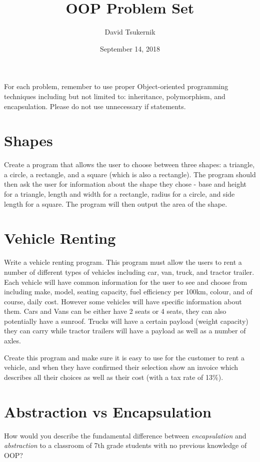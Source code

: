 \documentclass{problem-set}
\title{OOP Problem Set}
\date{September 14, 2018}
\author{David Tsukernik}
\begin{document}
\maketitle

\vspace{3ex}
For each problem, remember to use proper Object-oriented programming techniques including but not limited to: inheritance, polymorphism, and encapsulation. Please do not use unnecessary if statements.

\section{Shapes}

Create a program that allows the user to choose between three shapes: a triangle, a circle, a rectangle, and a square (which is also a rectangle). The program should then ask the user for information about the shape they chose - base and height for a triangle, length and width for a rectangle, radius for a circle, and side length for a square. The program will then output the area of the shape.

\section{Vehicle Renting}

Write a vehicle renting program. This program must allow the users to rent a number of different types of vehicles including car, van, truck, and tractor trailer. Each vehicle will have common information for the user to see and choose from including make, model, seating capacity, fuel efficiency per 100km, colour, and of course, daily cost. However some vehicles will have specific information about them. Cars and Vans can be either have 2 seats or 4 seats, they can also potentially have a sunroof. Trucks will have a certain payload (weight capacity) they can carry while tractor trailers will have a payload as well as a number of axles.

Create this program and make sure it is easy to use for the customer to rent a vehicle, and when they have confirmed their selection show an invoice which describes all their choices as well as their cost (with a tax rate of 13\%).

\section{Abstraction vs Encapsulation}

How would you describe the fundamental difference between \textit{encapsulation} and \textit{abstraction} to a classroom of 7th grade students with no previous knowledge of OOP?
\end{document}
